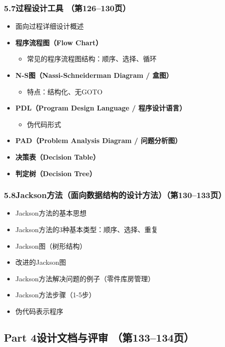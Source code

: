 \documentclass[12pt,a4paper]{ctexart}
\begin{document}
\subsubsection{5.7\quad 过程设计工具 \hfill（第126--130页）}
\begin{itemize}
    \item 面向过程详细设计概述
    \item \textbf{程序流程图（Flow Chart）}
    \begin{itemize}
        \item 常见的程序流程图结构：顺序、选择、循环
    \end{itemize}
    \item \textbf{N-S图（Nassi-Schneiderman Diagram / 盒图）}
    \begin{itemize}
        \item 特点：结构化、无GOTO
    \end{itemize}
    \item \textbf{PDL（Program Design Language / 程序设计语言）}
    \begin{itemize}
        \item 伪代码形式
    \end{itemize}
    \item \textbf{PAD（Problem Analysis Diagram / 问题分析图）}
    \item \textbf{决策表（Decision Table）}
    \item \textbf{判定树（Decision Tree）}
\end{itemize}

\subsubsection{5.8\quad Jackson方法（面向数据结构的设计方法）\hfill（第130--133页）}
\begin{itemize}
    \item Jackson方法的基本思想
    \item Jackson方法的3种基本类型：顺序、选择、重复
    \item Jackson图（树形结构）
    \item 改进的Jackson图
    \item Jackson方法解决问题的例子（零件库房管理）
    \item Jackson方法步骤（1-5步）
    \item 伪代码表示程序
\end{itemize}

\subsection{Part 4\quad 设计文档与评审 \hfill（第133--134页）}
\end{document}
